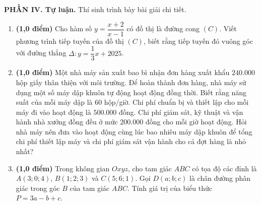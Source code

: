 \documentclass[12pt]{article}
\begin{document}
	\vspace{6mm}
	\noindent\textbf{PHẦN IV. Tự luận.} Thí sinh trình bày bài giải chi tiết.
	\vspace{3mm}
	
	\begin{enumerate}[label=\textbf{Bài \arabic*.}, leftmargin=*]
		
		\item \textbf{(1,0 điểm)} Cho hàm số $y = \dfrac{x + 2}{x - 1}$ có đồ thị là đường cong $(C)$. Viết phương trình tiếp tuyến của đồ thị $(C)$, biết rằng tiếp tuyến đó vuông góc với đường thẳng $\Delta: y = \dfrac{1}{3}x + 2025$.
		
		\vspace{4mm}
		\item \textbf{(1,0 điểm)} Một nhà máy sản xuất bao bì nhận đơn hàng xuất khẩu $240.000$ hộp giấy thân thiện với môi trường. Để hoàn thành đơn hàng, nhà máy sử dụng một số máy dập khuôn tự động hoạt động đồng thời. Biết rằng năng suất của mỗi máy dập là $60$ hộp/giờ. Chi phí chuẩn bị và thiết lập cho mỗi máy đi vào hoạt động là $500.000$ đồng. Chi phí giám sát, kỹ thuật và vận hành nhà xưởng đồng đều ở mức $200.000$ đồng cho mỗi giờ hoạt động. Hỏi nhà máy nên đưa vào hoạt động cùng lúc bao nhiêu máy dập khuôn để tổng chi phí thiết lập máy và chi phí giám sát vận hành cho cả đợt hàng là nhỏ nhất?
		
		\vspace{4mm}
		\item \textbf{(1,0 điểm)} Trong không gian $Oxyz$, cho tam giác $ABC$ có tọa độ các đỉnh là $A(3; 0; 4)$, $B(1; 2; 3)$ và $C(5; 6; 1)$. Gọi $D(a; b; c)$ là chân đường phân giác trong góc $B$ của tam giác $ABC$. Tính giá trị của biểu thức $P = 3a - b + c$.
		
	\end{enumerate}
	
\end{document}
